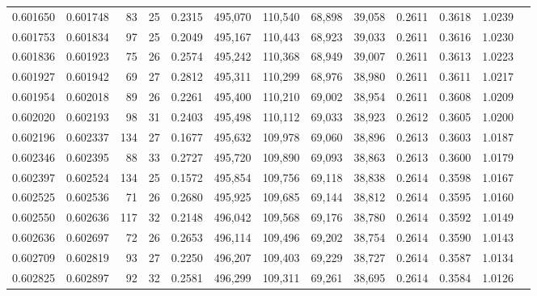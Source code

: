 \begin{tabular}{rrrrrrrrrrrrr}
0.601650 & 0.601748 &  83 &  25 &                                     0.2315 & 495,070 & 110,540 &  68,898 &  39,058 & 0.2611 & 0.3618 & 1.0239 \\
0.601753 & 0.601834 &  97 &  25 &                                     0.2049 & 495,167 & 110,443 &  68,923 &  39,033 & 0.2611 & 0.3616 & 1.0230 \\
0.601836 & 0.601923 &  75 &  26 &                                     0.2574 & 495,242 & 110,368 &  68,949 &  39,007 & 0.2611 & 0.3613 & 1.0223 \\
0.601927 & 0.601942 &  69 &  27 &                                     0.2812 & 495,311 & 110,299 &  68,976 &  38,980 & 0.2611 & 0.3611 & 1.0217 \\
0.601954 & 0.602018 &  89 &  26 &                                     0.2261 & 495,400 & 110,210 &  69,002 &  38,954 & 0.2611 & 0.3608 & 1.0209 \\
0.602020 & 0.602193 &  98 &  31 &                                     0.2403 & 495,498 & 110,112 &  69,033 &  38,923 & 0.2612 & 0.3605 & 1.0200 \\
0.602196 & 0.602337 & 134 &  27 &                                     0.1677 & 495,632 & 109,978 &  69,060 &  38,896 & 0.2613 & 0.3603 & 1.0187 \\
0.602346 & 0.602395 &  88 &  33 &                                     0.2727 & 495,720 & 109,890 &  69,093 &  38,863 & 0.2613 & 0.3600 & 1.0179 \\
0.602397 & 0.602524 & 134 &  25 &                                     0.1572 & 495,854 & 109,756 &  69,118 &  38,838 & 0.2614 & 0.3598 & 1.0167 \\
0.602525 & 0.602536 &  71 &  26 &                                     0.2680 & 495,925 & 109,685 &  69,144 &  38,812 & 0.2614 & 0.3595 & 1.0160 \\
0.602550 & 0.602636 & 117 &  32 &                                     0.2148 & 496,042 & 109,568 &  69,176 &  38,780 & 0.2614 & 0.3592 & 1.0149 \\
0.602636 & 0.602697 &  72 &  26 &                                     0.2653 & 496,114 & 109,496 &  69,202 &  38,754 & 0.2614 & 0.3590 & 1.0143 \\
0.602709 & 0.602819 &  93 &  27 &                                     0.2250 & 496,207 & 109,403 &  69,229 &  38,727 & 0.2614 & 0.3587 & 1.0134 \\
0.602825 & 0.602897 &  92 &  32 &                                     0.2581 & 496,299 & 109,311 &  69,261 &  38,695 & 0.2614 & 0.3584 & 1.0126 \\

\end{tabular}
